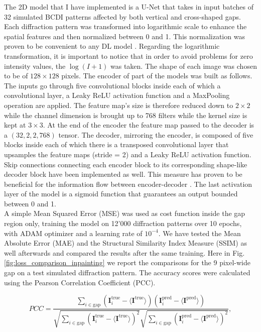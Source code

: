The 2D model that I have implemented is a U-Net that takes in input batches of 32 simulated BCDI patterns affected 
by both vertical and cross-shaped gaps. Each diffraction pattern was transformed into logarithmic scale to enhance the 
spatial features and then normalized between 0 and 1. This normalization was proven to be convenient to any DL model \cite{efficientBackProp}.
Regarding the logarithmic transformation, it is important to notice that in order to avoid problems for zero intensity
values, the $\log(I+1)$ was taken.
The shape of each image was chosen to be of $128\times128$ pixels. The encoder of part of the models was built as follows. 
The inputs go through five convolutional blocks 
inside each of which a convolutional layer, a Leaky ReLU activation function and a MaxPooling operation are applied. 
The feature map's size is therefore reduced down to $2\times2$ while the channel dimension is brought up to 768 filters 
while the kernel size is kept at $3\times3$. At the end of the encoder the feature map passed to the decoder is a 
$(32,2,2,768)$ tensor.
The decoder, mirroring the encoder, is composed of five blocks inside each of which there is a transposed convolutional layer
that upsamples the feature maps (stride = 2) and a Leaky ReLU activation function. Skip connections connecting each encoder block
to its corresponding shape-like decoder block have been implemented as well. This measure has proven to be beneficial 
for the information flow between encoder-decoder \cite{li_visualizing_2017}. The last activation layer of the model is 
a sigmoid function that guarantees an output bounded between 0 and 1. \\ 

A simple Mean Squared Error (MSE) was used as cost function inside the gap region only, training 
the model on 12'000 diffraction patterns over 10 epochs, with ADAM optimizer and a learning rate of $10^{-4}$. 
We have tested the Mean Absolute Error (MAE) and the Structural Similarity Index Measure (SSIM) \cite{ssim}
as well afterwards and compared the results after the same training.
Here in Fig. \ref{fig:loss_comparison_inpainting} we report the comparisons for the 9 pixel-wide gap on a test simulated diffraction
pattern. The accuracy scores were calculated using the Pearson Correlation Coefficient (PCC).

\begin{equation}
    PCC = \frac{\sum_{i\in \text{gap}}(\textbf{I}_i^{\text{true}} - 
    \langle \textbf{I}^{\text{true}}\rangle)(\textbf{I}_i^{\text{pred}}-
    \langle\textbf{I}^{\text{pred}}\rangle)}{\sqrt{\sum_{i\in \text{gap}}^{}(\textbf{I}_i^{\text{true}} - 
    \langle \textbf{I}^{\text{true}}\rangle)^2}\sqrt{\sum_{i\in \text{gap}}^{}(\textbf{I}_i^{\text{pred}}-
    \langle\textbf{I}^{\text{pred}}\rangle)^2}},
        \label{eq:accuracy}
\end{equation}

